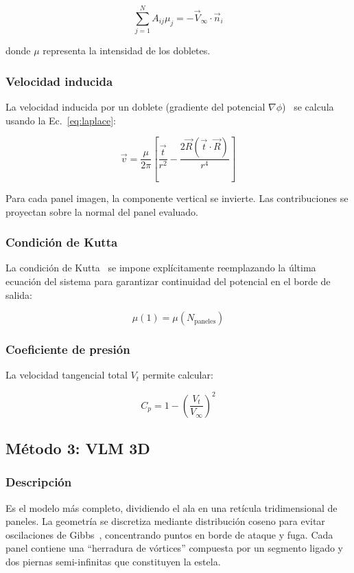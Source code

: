 \documentclass[twocolumn]{article}
\begin{document}
\begin{equation}
\sum_{j=1}^{N} A_{ij} \mu_j = -\vec{V}_{\infty} \cdot \vec{n}_i
\end{equation}

donde $\mu$ representa la intensidad de los dobletes.

\subsubsection{Velocidad inducida}
La velocidad inducida por un doblete (gradiente del potencial $\nabla \phi$)~\cite{hess1967} se calcula usando la Ec.~\eqref{eq:laplace}:

\begin{equation}
\vec{v} = \frac{\mu}{2\pi} \left[ \frac{\vec{t}}{r^2} - \frac{2\vec{R}(\vec{t}\cdot\vec{R})}{r^4} \right]
\label{eq:doblete}
\end{equation}

Para cada panel imagen, la componente vertical se invierte. Las contribuciones se proyectan sobre la normal del panel evaluado.

\subsubsection{Condición de Kutta}
La condición de Kutta~\cite{katz2001} se impone explícitamente reemplazando la última ecuación del sistema para garantizar continuidad del potencial en el borde de salida:

\begin{equation}
\mu(1) = \mu(N_{\text{paneles}})
\end{equation}

\subsubsection{Coeficiente de presión}
La velocidad tangencial total $V_t$ permite calcular:

\begin{equation}
C_p = 1 - \left(\frac{V_t}{V_{\infty}}\right)^2
\label{eq:cp}
\end{equation}

\subsection{Método 3: VLM 3D}

\subsubsection{Descripción}
Es el modelo más completo, dividiendo el ala en una retícula tridimensional de paneles. La geometría se discretiza mediante distribución coseno para evitar oscilaciones de Gibbs~\cite{katz2001}, concentrando puntos en borde de ataque y fuga. Cada panel contiene una ``herradura de vórtices'' compuesta por un segmento ligado y dos piernas semi-infinitas que constituyen la estela.
\end{document}
